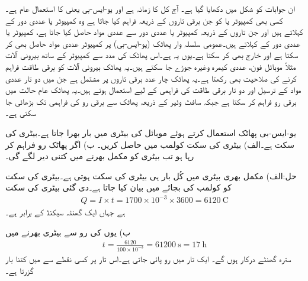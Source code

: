 ان جوابات کو شکل  میں دکھایا گیا ہے۔
آج کل  کا زمانہ ہے اور  یو-ایس-بی یعنی  کا استعمال عام ہے۔کسی بھی کمپیوٹر یا  کو  جن برقی تاروں کے ذریعہ فراہم کیا جاتا ہے وہ کمپیوٹر یا عددی دور کے  کہلاتے ہیں اور جن تاروں کے ذریعہ کمپیوٹر یا عددی دور سے عددی مواد حاصل کیا جاتا ہے، کمپیوٹر یا عددی دور کے   کہلاتے ہیں۔عمومی سلسلہ وار پھاٹک (یو-ایس-بی) پر کمپیوٹر عددی مواد حاصل بھی کر سکتا ہے اور خارج بھی  کر سکتا ہے۔یوں یہ  ہے۔اس پھاٹک کی مدد سے کمپیوٹر کے ساتھ بیرونی آلات مثلاً موبائل فون، عددی کیمرہ وغیرہ جوڑے جا سکتے ہیں۔یہ پھاٹک بیرونی آلات کو برقی طاقت فراہم کرنے کی صلاحیت بھی رکھتا ہے۔یہ پھاٹک چار عدد برقی تاروں پر مشتمل ہے جن میں دو تار عددی مواد کے ترسیل اور دو تار برقی طاقت کی فراہمی کے لیے استعمال ہوتے ہیں۔یہ پھاٹک عام حالت میں  برقی رو فراہم کر سکتا ہے جبکہ سافٹ وئیر کے ذریعہ پھاٹک سے برقی رو کی فراہمی  تک بڑھائی جا سکتی ہے۔

یو-ایس-بی پھاٹک استعمال کرتے ہوئے موبائل کی  بیٹری میں بار بھرا جاتا ہے۔بیٹری کی سکت  ہے۔الف) بیٹری کی سکت کولمب  میں حاصل کریں۔ ب) اگر پھاٹک  رو فراہم کر رہا ہو تب بیٹری کو مکمل بھرنے میں کتنی دیر لگے گی۔ 

حل:الف) مکمل بھری بیٹری میں کُل بار ہی بیٹری کی سکت ہوتی ہے۔بیٹری کی سکت کو کولمب  کی بجائے  میں بیان کیا جاتا ہے۔دی گئی بیٹری کی سکت
\begin{align*}
Q=I\times t=1700 \times 10^{-3} \times 3600=\SI{6120}{\coulomb}
\end{align*}
ہے جہاں ایک گھنٹہ   سیکنڈ کے برابر ہے۔ 

ب) یوں  کی رو سے بیٹری بھرنے میں
\begin{align*}
t=\frac{6120}{100\times 10^{-3}}=\SI{61200}{\second} =\SI{17}{\hour}
\end{align*}
سترہ گھنٹے درکار ہوں گے۔
ایک تار میں  رو پائی جاتی ہے۔اس تار پر کسی نقطے سے  میں کتنا بار گزرتا ہے۔

